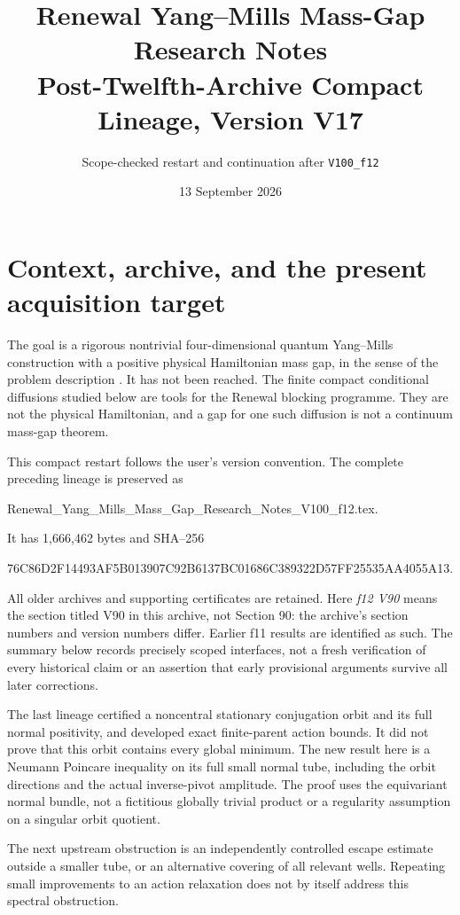 \documentclass[11pt,oneside]{article}
\title{Renewal Yang--Mills Mass-Gap Research Notes\\
Post-Twelfth-Archive Compact Lineage, Version V17}
\author{Scope-checked restart and continuation after \texttt{V100\_f12}}
\date{13 September 2026}
\begin{document}
\maketitle
\tableofcontents

\section{Context, archive, and the present acquisition target}

The goal is a rigorous nontrivial four-dimensional quantum
Yang--Mills construction with a positive physical Hamiltonian
mass gap, in the sense of the problem description
\cite{jaffe-witten}. It has not been reached. The finite
compact conditional diffusions studied below are tools for
the Renewal blocking programme. They are not the physical
Hamiltonian, and a gap for one such diffusion is not a
continuum mass-gap theorem.

This compact restart follows the user's version convention.
The complete preceding lineage is preserved as
\begin{center}\small\ttfamily
Renewal\_Yang\_Mills\_Mass\_Gap\_Research\_Notes\_V100\_f12.tex.
\end{center}
It has 1,666,462 bytes and SHA--256
\begin{center}\scriptsize\ttfamily
76C86D2F14493AF5B013907C92B6137BC01686C389322D57FF25535AA4055A13.
\end{center}
All older archives and supporting certificates are retained.
Here \emph{f12 V90} means the section titled V90 in this
archive, not Section 90: the archive's section numbers and
version numbers differ. Earlier f11 results are identified
as such. The summary below records precisely scoped
interfaces, not a fresh verification of every historical
claim or an assertion that early provisional arguments
survive all later corrections.

The last lineage certified a noncentral stationary
conjugation orbit and its full normal positivity, and
developed exact finite-parent action bounds. It did not
prove that this orbit contains every global minimum.
The new result here is a Neumann Poincare inequality on
its full small normal tube, including the orbit directions
and the actual inverse-pivot amplitude. The proof uses
the equivariant normal bundle, not a fictitious globally
trivial product or a regularity assumption on a singular
orbit quotient.

The next upstream obstruction is an independently
controlled escape estimate outside a smaller tube, or
an alternative covering of all relevant wells. Repeating
small improvements to an action relaxation does not by
itself address this spectral obstruction.
\end{document}
